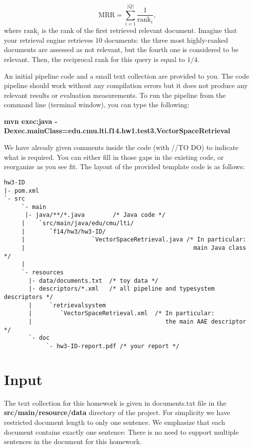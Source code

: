 \documentclass[oneside,11pt]{memoir}
\begin{document}
\begin{equation}\label{EqMRR}
\mbox{MRR} = \sum\limits_{i=1}^{|Q|} \frac{1} {\mbox{rank}_i},
\end{equation}
where $\mbox{rank}_i$ is the rank of the first retrieved relevant document.
Imagine that your retrieval engine retrieves 10 documents:
the three most highly-ranked documents are assessed as not relevant,
but the fourth one is considered to be relevant. Then, the reciprocal
rank for this query is equal to $1/4$.

An initial pipeline code and a small text collection are provided to you. 
The code pipeline should work without any compilation errors but it does not produce any relevant results or evaluation measurements.
To run the pipeline from the command line (terminal window), you can type the following:

\begin{center}\small\textbf{mvn exec:java 
       -Dexec.mainClass=edu.cmu.lti.f14.hw1.test3.VectorSpaceRetrieval}\end{center}

We have already given comments inside the code (with //TO DO) to indicate what is required. 
You can either fill in those gaps in the existing code, or reorganize as you see fit.
The layout of the provided template code is as follows:

\hspace{-3em}
\begin{minipage}{0.9\textwidth}
\footnotesize
\begin{verbatim}
hw3-ID
|- pom.xml
`- src
     `- main
      |- java/**/*.java        /* Java code */
     |    `src/main/java/edu/cmu/lti/
     |       `f14/hw3/hw3-ID/
     |                   `VectorSpaceRetrieval.java /* In particular:
     |                                                main Java class */
     |                           
     `- resources
       |- data/documents.txt  /* toy data */ 
       |- descriptors/*.xml   /* all pipeline and typesystem descriptors */
       |     `retrievalsystem
       |        `VectorSpaceRetrieval.xml  /* In particular: 
       |                                      the main AAE descriptor */
       `- doc
            `- hw3-ID-report.pdf /* your report */

\end{verbatim}
\normalsize
\end{minipage}



\section{Input}
The text collection for this homework is given in documents.txt file in 
the \textbf{src/main/resource/data} directory of the project. 
For simplicity we have restricted document length to only one sentence. 
We emphasize that each document contains exactly one sentence:
There is no need to support multiple sentences in the document for this
homework.
\end{document}
